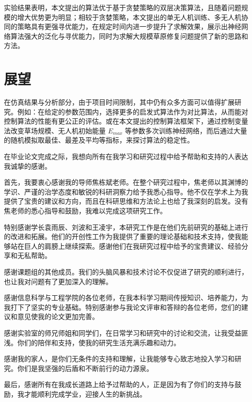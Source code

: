 \documentclass[AutoFakeBold]{LZUThesis}
\begin{document}
实验结果表明，本文提出的算法优于基于贪婪策略的双层决策算法，且随着问题规模的增大优势更为明显；相较于贪婪策略，本文提出的单无人机训练、多无人机协同的策略具有更强寻优能力，在规定时间内进一步提升了求解效果，展示出神经网络算法强大的泛化与寻优能力，同时为求解大规模草原修复问题提供了新的思路和方法。

\section{展望}
在仿真结果与分析部分，由于项目时间限制，其中仍有众多方面可以值得扩展研究。例如：在给定的参数范围内，选择更多的启发式算法作为对比算法，从而能对控制算法的性能有更公正的评估。或在本文提出的控制算法框架下，通过控制变量法改变草场规模、无人机初始能量 $E_{max}$ 等参数多次训练神经网络，而后通过大量的随机模拟取最佳、最差及平均等指标，来探讨算法的稳定性。


\backmatter
\printbib




\Thanks

在毕业论文完成之际，我想向所有在我学习和研究过程中给予帮助和支持的人表达我诚挚的感谢。

首先，我要衷心感谢我的导师焦栋斌老师。在整个研究过程中，焦老师以其渊博的学识、严谨的治学态度和敏锐的科研洞察力给予我悉心指导。他不仅在学术上为我提供了宝贵的建议和方向，而且在科研思维和方法论上也给了我深刻的启发。没有焦老师的悉心指导和鼓励，我难以完成这项研究工作。

特别感谢学长袁雨辰、刘波和王凌宇，本研究工作是在他们先前研究的基础上进行的改进和拓展。他们的开创性工作为我提供了重要的理论基础和技术支持，使我能够站在巨人的肩膀上继续探索。感谢他们在我研究过程中给予的宝贵建议、经验分享和无私帮助。

感谢课题组的其他成员。我们的头脑风暴和技术讨论不仅促进了研究的顺利进行，也让我对问题有了更加深入的理解。

感谢信息科学与工程学院的各位老师，在我本科学习期间传授知识、培养能力，为我打下了坚实的专业基础。特别感谢参与我论文评审和答辩的各位老师，您们的建议和意见使我的论文更加完善。

感谢实验室的师兄师姐和同学们，在日常学习和研究中的讨论和交流，让我受益匪浅。你们的陪伴和支持，使我的研究生活充满乐趣和动力。

感谢我的家人，是你们无条件的支持和理解，让我能够专心致志地投入学习和研究。你们是我坚强的后盾和不断前行的动力源泉。

最后，感谢所有在我成长道路上给予过帮助的人，正是因为有了你们的支持与鼓励，我才能顺利完成学业，迎接人生的新挑战。

\Grade %
\end{document}
